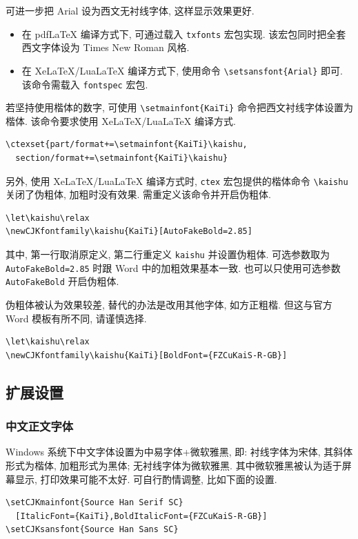 \documentclass{article}
\let\kaishu\relax\newCJKfontfamily\kaishu{KaiTi}[AutoFakeBold=2.85] %
\begin{document}
可进一步把 Arial 设为西文无衬线字体, 这样显示效果更好.
\begin{itemize}
  \item
    在 pdfLaTeX 编译方式下, 可通过载入 \verb'txfonts' 宏包实现.
    该宏包同时把全套西文字体设为 Times New Roman 风格.
  \item
    在 XeLaTeX/LuaLaTeX 编译方式下, 使用命令 \verb'\setsansfont{Arial}' 即可.
    该命令需载入 \verb'fontspec' 宏包.
\end{itemize}

若坚持使用楷体的数字, 可使用 \verb'\setmainfont{KaiTi}' 命令把西文衬线字体设置为楷体.
该命令要求使用 XeLaTeX/LuaLaTeX 编译方式.
\begin{verbatim}
\ctexset{part/format+=\setmainfont{KaiTi}\kaishu,
  section/format+=\setmainfont{KaiTi}\kaishu}
\end{verbatim}

另外, 使用 XeLaTeX/LuaLaTeX 编译方式时, \verb'ctex' 宏包提供的楷体命令 \verb'\kaishu' 关闭了伪粗体, 加粗时没有效果.
需重定义该命令并开启伪粗体.
\begin{verbatim}
\let\kaishu\relax
\newCJKfontfamily\kaishu{KaiTi}[AutoFakeBold=2.85]
\end{verbatim}
其中, 第一行取消原定义, 第二行重定义 \verb'kaishu' 并设置伪粗体.
可选参数取为 \verb'AutoFakeBold=2.85' 时跟 Word 中的加粗效果基本一致.
也可以只使用可选参数 \verb'AutoFakeBold' 开启伪粗体.

伪粗体被认为效果较差, 替代的办法是改用其他字体, 如方正粗楷.
但这与官方 Word 模板有所不同, 请谨慎选择.
\begin{verbatim}
\let\kaishu\relax
\newCJKfontfamily\kaishu{KaiTi}[BoldFont={FZCuKaiS-R-GB}]
\end{verbatim}

\subsection{扩展设置}

\subsubsection{中文正文字体}

Windows 系统下中文字体设置为中易字体+微软雅黑, 即: 衬线字体为宋体, 其斜体形式为楷体, 加粗形式为黑体; 无衬线字体为微软雅黑.
其中微软雅黑被认为适于屏幕显示, 打印效果可能不太好.
可自行酌情调整, 比如下面的设置.
\begin{verbatim}
\setCJKmainfont{Source Han Serif SC}
  [ItalicFont={KaiTi},BoldItalicFont={FZCuKaiS-R-GB}]
\setCJKsansfont{Source Han Sans SC}
\end{verbatim}
\end{document}
